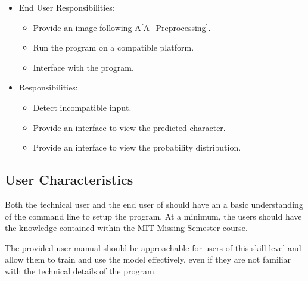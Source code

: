 \documentclass[12pt]{article}
\begin{document}
\begin{itemize}
\item End User Responsibilities:
\begin{itemize}
\item Provide an image following A\ref{A_Preprocessing}.
\item Run the program on a compatible platform.
\item Interface with the program.
\end{itemize}
\item \progname{} Responsibilities:
\begin{itemize}
\item Detect incompatible input.
\item Provide an interface to view the predicted character.
\item Provide an interface to view the probability distribution.
\end{itemize}
\end{itemize}


\subsection{User Characteristics} \label{SecUserCharacteristics}

Both the technical user and the end user of \progname{} should have an a basic
understanding of the command line to setup the program. At a minimum, the users
should have the knowledge contained within the \href{https://missing.csail.mit.edu/}{MIT Missing Semester} course.

The provided user manual should be approachable for users of this skill level
and allow them to train and use the model effectively, even if they are not
familiar with the technical details of the program.

\end{document}
